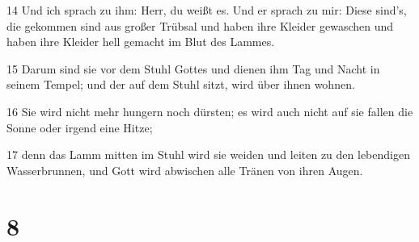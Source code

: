 \par 14 Und ich sprach zu ihm: Herr, du weißt es. Und er sprach zu mir: Diese sind's, die gekommen sind aus großer Trübsal und haben ihre Kleider gewaschen und haben ihre Kleider hell gemacht im Blut des Lammes.
\par 15 Darum sind sie vor dem Stuhl Gottes und dienen ihm Tag und Nacht in seinem Tempel; und der auf dem Stuhl sitzt, wird über ihnen wohnen.
\par 16 Sie wird nicht mehr hungern noch dürsten; es wird auch nicht auf sie fallen die Sonne oder irgend eine Hitze;
\par 17 denn das Lamm mitten im Stuhl wird sie weiden und leiten zu den lebendigen Wasserbrunnen, und Gott wird abwischen alle Tränen von ihren Augen.

\chapter{8}

